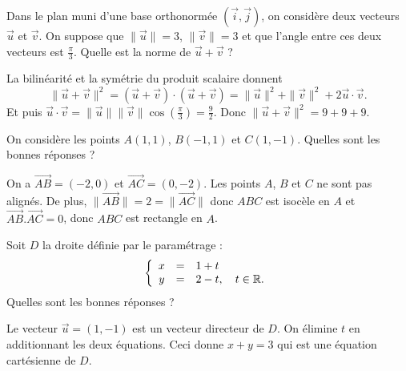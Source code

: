 \begin{question}
Dans le plan muni d'une base orthonormée $(\vec{i},\vec{j})$, on considère deux vecteurs $\displaystyle \vec{u}$ et $\displaystyle \vec{v}$. On suppose que $\|\vec{u}\|=3$, $\|\vec{v}\|=3$ et que l'angle entre ces deux vecteurs est $\displaystyle \frac{\pi}{3}$. Quelle est la norme de $\vec{u}+\vec{v}$ ?
\begin{answers}  
\end{answers}
\begin{explanations}
La bilinéarité et la symétrie du produit scalaire donnent
$$\|\vec{u}+\vec{v}\|^2=(\vec{u}+\vec{v})\cdot(\vec{u}+\vec{v})=\|\vec{u}\|^2+\|\vec{v}\|^2+2\vec{u}\cdot\vec{v}.$$
Et puis $\displaystyle \vec{u}\cdot \vec{v}=\|\vec{u}\|\|\vec{v}\|\cos \left(\frac{\pi}{3}\right)=\frac{9}{2}$. Donc $\|\vec{u}+\vec{v}\|^2=9+9+9$.
\end{explanations}
\end{question}


\begin{question}
On considère les points $A(1,1)$, $B(-1,1)$ et $C(1,-1)$. Quelles sont les bonnes réponses ?
\begin{answers}  
\end{answers}
\begin{explanations}
On a $\overrightarrow{AB}=(-2,0)$ et $\overrightarrow{AC}=(0,-2)$. Les points $A$, $B$ et $C$ ne sont pas alignés. De plus, $\|\overrightarrow{AB}\|=2=\|\overrightarrow{AC}\|$ donc $ABC$ est isocèle en $A$ et $\overrightarrow{AB}.\overrightarrow{AC}=0$, donc $ABC$ est rectangle en $A$.
\end{explanations}
\end{question}


\begin{question}
Soit $D$ la droite définie par le paramétrage :
$$\left\{\begin{array}{ccl}x&=&1+t\\ y&=&2-t,\quad t\in \mathbb{R}.
\end{array}\right.$$
Quelles sont les bonnes réponses ?
\begin{answers}  
\end{answers}
\begin{explanations}
Le vecteur $\vec{u}=(1,-1)$ est un vecteur directeur de $D$. On élimine $t$ en additionnant les deux équations. Ceci donne $x+y=3$ qui est une équation cartésienne de $D$.
\end{explanations}
\end{question}



